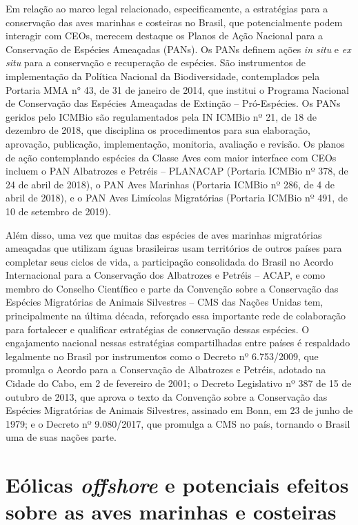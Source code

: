 \documentclass[
  oneside]{scrbook}
\begin{document}
Em relação ao marco legal relacionado, especificamente, a estratégias para a conservação das aves marinhas e costeiras no Brasil, que potencialmente podem interagir com CEOs, merecem destaque os Planos de Ação Nacional para a Conservação de Espécies Ameaçadas (PANs). Os PANs definem ações \emph{in situ} e \emph{ex situ} para a conservação e recuperação de espécies. São instrumentos de implementação da Política Nacional da Biodiversidade, contemplados pela Portaria MMA n° 43, de 31 de janeiro de 2014, que institui o Programa Nacional de Conservação das Espécies Ameaçadas de Extinção -- Pró-Espécies. Os PANs geridos pelo ICMBio são regulamentados pela IN ICMBio nº 21, de 18 de dezembro de 2018, que disciplina os procedimentos para sua elaboração, aprovação, publicação, implementação, monitoria, avaliação e revisão. Os planos de ação contemplando espécies da Classe Aves com maior interface com CEOs incluem o PAN Albatrozes e Petréis -- PLANACAP (Portaria ICMBio nº 378, de 24 de abril de 2018), o PAN Aves Marinhas (Portaria ICMBio nº 286, de 4 de abril de 2018), e o PAN Aves Limícolas Migratórias (Portaria ICMBio nº 491, de 10 de setembro de 2019).

Além disso, uma vez que muitas das espécies de aves marinhas migratórias ameaçadas que utilizam águas brasileiras usam territórios de outros países para completar seus ciclos de vida, a participação consolidada do Brasil no Acordo Internacional para a Conservação dos Albatrozes e Petréis -- ACAP, e como membro do Conselho Científico e parte da Convenção sobre a Conservação das Espécies Migratórias de Animais Silvestres -- CMS das Nações Unidas tem, principalmente na última década, reforçado essa importante rede de colaboração para fortalecer e qualificar estratégias de conservação dessas espécies. O engajamento nacional nessas estratégias compartilhadas entre países é respaldado legalmente no Brasil por instrumentos como o Decreto nº 6.753/2009, que promulga o Acordo para a Conservação de Albatrozes e Petréis, adotado na Cidade do Cabo, em 2 de fevereiro de 2001; o Decreto Legislativo nº 387 de 15 de outubro de 2013, que aprova o texto da Convenção sobre a Conservação das Espécies Migratórias de Animais Silvestres, assinado em Bonn, em 23 de junho de 1979; e o Decreto nº 9.080/2017, que promulga a CMS no país, tornando o Brasil uma de suas nações parte.

\hypertarget{euxf3licas-offshore-e-potenciais-efeitos-sobre-as-aves-marinhas-e-costeiras}{%
\section{\texorpdfstring{Eólicas \emph{offshore} e potenciais efeitos sobre as aves marinhas e costeiras}{Eólicas offshore e potenciais efeitos sobre as aves marinhas e costeiras}}\label{euxf3licas-offshore-e-potenciais-efeitos-sobre-as-aves-marinhas-e-costeiras}}
\end{document}
